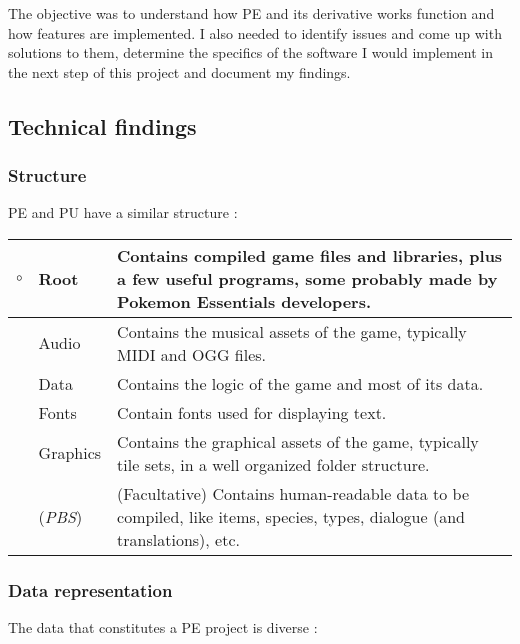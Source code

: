 \documentclass[11pt]{article}
\begin{document}
The objective was to understand how PE and its derivative works function and how features are implemented. I also needed to identify issues and come up with solutions to them, determine the specifics of the software I would implement in the next step of this project and document my findings.




\subsection{Technical findings}

\subsubsection{Structure}

PE and PU have a similar structure :

\begin{tabular}{|r L{.1\linewidth}|L{.8\linewidth}|}
	\hline
	$\circ$ & Root & Contains compiled game files and libraries, plus a few useful programs, some probably made by Pokemon Essentials developers. \\
	\hline
	 & Audio & Contains the musical assets of the game, typically MIDI and OGG files. \\
	\hline
	 & Data & Contains the logic of the game and most of its data.  \\
	\hline
	 & Fonts & Contain fonts used for displaying text. \\
	\hline
	 & Graphics & Contains the graphical assets of the game, typically tile sets, in a well organized folder structure. \\
	\hline
	 & (\textit{PBS}) & (Facultative) Contains human-readable data to be compiled, like items, species, types, dialogue (and translations), etc. \\
	\hline
\end{tabular}




\subsubsection{Data representation}

The data that constitutes a PE project is diverse :
\end{document}
